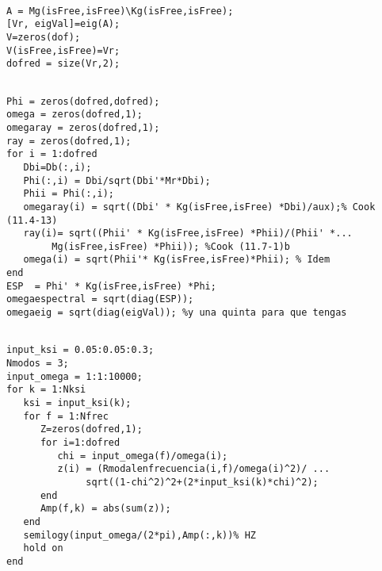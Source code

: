 \begin{code}
	\begin{verbatim}
	
A = Mg(isFree,isFree)\Kg(isFree,isFree);
[Vr, eigVal]=eig(A);
V=zeros(dof);
V(isFree,isFree)=Vr;
dofred = size(Vr,2);
	\end{verbatim}
\end{code}


\begin{code}
	\begin{verbatim}
	
Phi = zeros(dofred,dofred);
omega = zeros(dofred,1);
omegaray = zeros(dofred,1);
ray = zeros(dofred,1);
for i = 1:dofred
   Dbi=Db(:,i);
   Phi(:,i) = Dbi/sqrt(Dbi'*Mr*Dbi);
   Phii = Phi(:,i); 
   omegaray(i) = sqrt((Dbi' * Kg(isFree,isFree) *Dbi)/aux);% Cook (11.4-13)
   ray(i)= sqrt((Phii' * Kg(isFree,isFree) *Phii)/(Phii' *...
        Mg(isFree,isFree) *Phii)); %Cook (11.7-1)b
   omega(i) = sqrt(Phii'* Kg(isFree,isFree)*Phii); % Idem
end
ESP  = Phi' * Kg(isFree,isFree) *Phi;
omegaespectral = sqrt(diag(ESP));
omegaeig = sqrt(diag(eigVal)); %y una quinta para que tengas
	\end{verbatim}
\end{code}

\begin{code}
	\begin{verbatim}
	
input_ksi = 0.05:0.05:0.3;
Nmodos = 3;
input_omega = 1:1:10000;
for k = 1:Nksi
   ksi = input_ksi(k);
   for f = 1:Nfrec
      Z=zeros(dofred,1);
      for i=1:dofred
         chi = input_omega(f)/omega(i);
         z(i) = (Rmodalenfrecuencia(i,f)/omega(i)^2)/ ...
              sqrt((1-chi^2)^2+(2*input_ksi(k)*chi)^2);
      end
      Amp(f,k) = abs(sum(z));
   end
   semilogy(input_omega/(2*pi),Amp(:,k))% HZ
   hold on
end
	\end{verbatim}
\end{code}